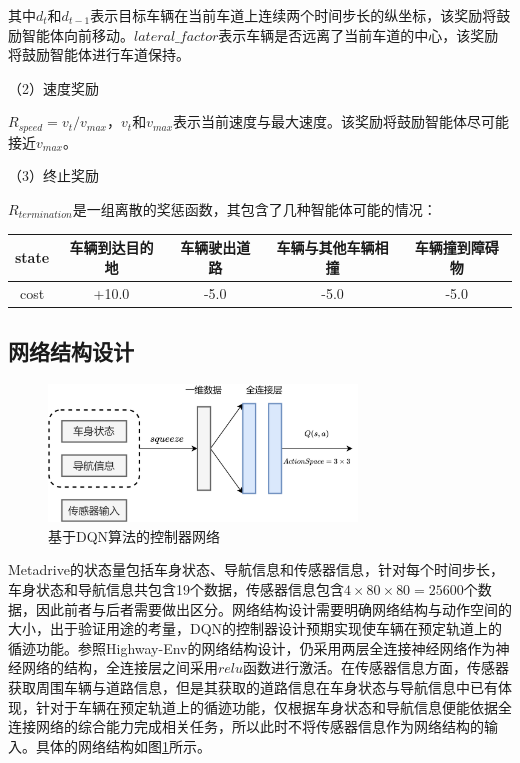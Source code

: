 其中$d_t$和$d_{t-1}$表示目标车辆在当前车道上连续两个时间步长的纵坐标，该奖励将鼓励智能体向前移动。$lateral\_factor$表示车辆是否远离了当前车道的中心，该奖励将鼓励智能体进行车道保持。

（2）速度奖励

$R_{speed} = v_t / v_{max}$，$v_t$和$v_{max}$表示当前速度与最大速度。该奖励将鼓励智能体尽可能接近$v_{max}$。

（3）终止奖励

$R_{termination}$是一组离散的奖惩函数，其包含了几种智能体可能的情况：
\begin{table}[htbp]
    \vspace{13pt}
    \centering
    \renewcommand\arraystretch{1.5}
    \begin{tabular}{|c|c|c|c|c|}
    \hline
    state & 车辆到达目的地 & 车辆驶出道路 & 车辆与其他车辆相撞 & 车辆撞到障碍物 \\ \hline
    cost  & +10.0   & -5.0   & -5.0      & -5.0    \\ \hline
    \end{tabular}
\end{table}

\subsection{网络结构设计} %

\begin{figure}[htbp]
    \vspace{13pt}
    \centering
    \includegraphics[width=0.73\textwidth]{images/chapter3/metadrive_control.png}
    \caption{基于DQN算法的控制器网络}\label{DQN算法的控制器网络} %
\end{figure}  

Metadrive的状态量包括车身状态、导航信息和传感器信息，针对每个时间步长，车身状态和导航信息共包含19个数据，传感器信息包含$4\times80\times80=25600$个数据，因此前者与后者需要做出区分。网络结构设计需要明确网络结构与动作空间的大小，出于验证用途的考量，DQN的控制器设计预期实现使车辆在预定轨道上的循迹功能。参照Highway-Env的网络结构设计，仍采用两层全连接神经网络作为神经网络的结构，全连接层之间采用$relu$函数进行激活。在传感器信息方面，传感器获取周围车辆与道路信息，但是其获取的道路信息在车身状态与导航信息中已有体现，针对于车辆在预定轨道上的循迹功能，仅根据车身状态和导航信息便能依据全连接网络的综合能力完成相关任务，所以此时不将传感器信息作为网络结构的输入。具体的网络结构如图\ref{DQN算法的控制器网络}所示。

